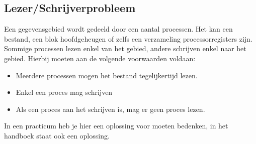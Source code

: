 
\newpage

\subsection{Lezer/Schrijverprobleem}

Een gegevensgebied wordt gedeeld door een aantal processen. Het kan een bestand, een blok hoofdgeheugen of zelfs een verzameling processorregisters zijn. Sommige processen lezen enkel van het gebied, andere schrijven enkel naar het gebied.
Hierbij moeten aan de volgende voorwaarden voldaan:

\begin{itemize}
\item Meerdere processen mogen het bestand tegelijkertijd lezen.
\item Enkel een proces mag schrijven
\item Als een proces aan het schrijven is, mag er geen proces lezen.
\end{itemize}

In een practicum heb je hier een oplossing voor moeten bedenken, in het handboek staat ook een oplossing.